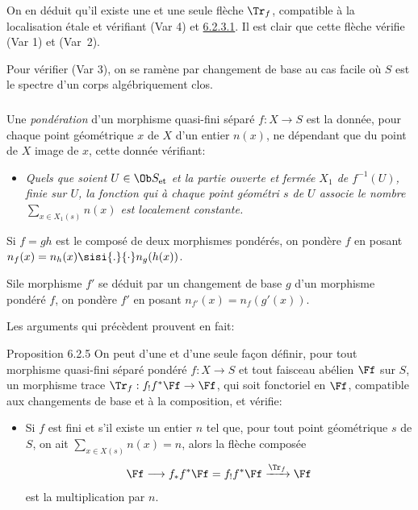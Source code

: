 On en déduit qu'il existe une et une seule flèche $\Tr_{f}$, compatible
à la localisation étale et vérifiant (Var 4) et \hyperref[XVII.lem6.2.3.1]{6.2.3.1}. Il est clair
que cette flèche vérifie (Var 1) et (Var~2).

Pour vérifier (Var 3), on se ramène par changement de base au cas
facile où $S$ est le spectre d'un corps algébriquement clos.

\setcounter{subsubsection}{3}
\subsubsection{}
Une \emph{pondération} d'un morphisme quasi-fini séparé
$f:X\rightarrow S$ est la donnée, pour chaque point géométrique $x$ de
$X$ d'un entier $n(x)$, ne dépendant que du point de $X$ image de $x$,
cette donnée vérifiant:
\begin{itemize}
\item[$(\ast)$] \emph{Quels que soient $U\in \Ob S_{\text{\rm et}}$ et
la partie ouverte et fermée $X_{1}$ de $f^{-1}(U)$, finie sur $U$, la
fonction qui à chaque point géométri $s$ de $U$ associe le nombre
$\sum_{x\in X_{1}(s)}n(x)$ est localement constante.}
\end{itemize}

Si $f=gh$ est le composé de deux morphismes pondérés, on pondère $f$
en posant $n_{f}(x)=n_{h}(x)\sisi{.}{\cdot}n_{g}(h(x))$.

Si\pageoriginale le morphisme $f'$ se déduit par un changement de base
$g$ d'un morphisme pondéré $f$, on pondère $f'$ en posant
$n_{f'}(x)=n_{f}(g'(x))$.

Les arguments qui précèdent prouvent en fait:

\begin{enonce*}{Proposition 6.2.5}
On peut d'une et d'une seule façon définir, pour tout morphisme
quasi-fini séparé pondéré $f:X\rightarrow S$ et tout faisceau abélien
$\Ff $ sur $S$, un morphisme trace
$\Tr_{f}:f_{!}f^{\ast}\Ff \rightarrow \Ff $, qui soit
fonctoriel en $\Ff $, compatible aux changements de base et à
la composition, et vérifie:
\begin{itemize}
\item[\textsuperscript{(Var $\sisi{\leftexp{\prime}{4}}{4'}$)}] Si $f$ est fini et s'il existe un entier $n$ tel
que, pour tout point géométrique $s$ de $S$, on ait $\sum_{x\in
X(s)}n(x)=n$, alors la flèche composée
$$
\Ff \longrightarrow
f_{\ast}f^{\ast}\Ff =f_{!}f^{\ast}\Ff \xrightarrow{\Tr_{f}}\Ff
$$
est la multiplication par $n$.
\end{itemize}
\end{enonce*}

